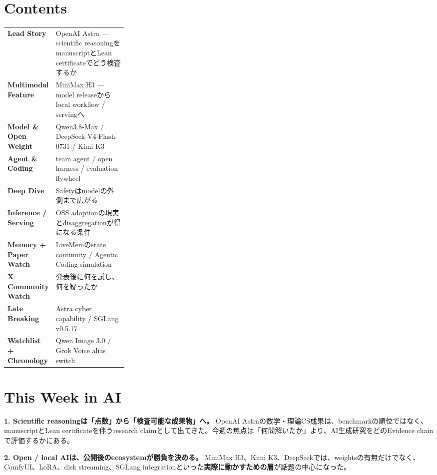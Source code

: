 \section*{Contents}
\begin{tabularx}{0.98\linewidth}{@{}>{\bfseries}p{0.28\linewidth}X@{}}
Lead Story & OpenAI Astra --- scientific reasoningをmanuscriptとLean certificateでどう検査するか \\
Multimodal Feature & MiniMax H3 --- model releaseからlocal workflow / servingへ \\
Model \& Open Weight & Qwen3.8-Max / DeepSeek-V4-Flash-0731 / Kimi K3 \\
Agent \& Coding & team agent / open harness / evaluation flywheel \\
Deep Dive & Safetyはmodelの外側まで広がる \\
Inference / Serving & OSS adoptionの現実とdisaggregationが得になる条件 \\
Memory + Paper Watch & LiveMemのstate continuity / Agentic Coding simulation \\
X Community Watch & 発表後に何を試し、何を疑ったか \\
Late Breaking & Astra cyber capability / SGLang v0.5.17 \\
Watchlist + Chronology & Qwen Image 3.0 / Grok Voice alias switch \\
\end{tabularx}

\vspace{4mm}
\section*{This Week in AI}

\begin{tcolorbox}[enhanced,colback=SurveySoft,colframe=SurveyRule,boxrule=0.4pt,arc=1mm,left=3mm,right=3mm,top=2mm,bottom=2mm]
\textbf{1. Scientific reasoningは「点数」から「検査可能な成果物」へ。}\quad
OpenAI Astraの数学・理論CS成果は、benchmarkの順位ではなく、manuscriptとLean certificateを伴うresearch claimとして出てきた\cite{openai-astra-ten-advances}。今週の焦点は「何問解いたか」より、AI生成研究をどのEvidence chainで評価するかにある。
\end{tcolorbox}

\begin{tcolorbox}[enhanced,colback=SurveySoft,colframe=SurveyRule,boxrule=0.4pt,arc=1mm,left=3mm,right=3mm,top=2mm,bottom=2mm]
\textbf{2. Open / local AIは、公開後のecosystemが勝負を決める。}\quad
MiniMax H3、Kimi K3、DeepSeekでは、weightsの有無だけでなく、ComfyUI、LoRA、disk streaming、SGLang integrationといった\textbf{実際に動かすための層}が話題の中心になった\cite{minimax-h3-blog,kimi-k3-hf,sglang-0517}。
\end{tcolorbox}

